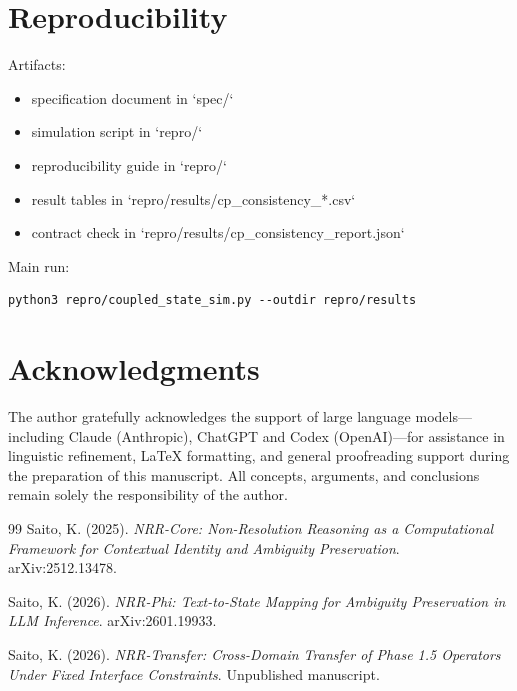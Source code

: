 \documentclass[11pt,a4paper]{article}
\begin{document}
\section{Reproducibility}
\label{sec:reproducibility}
Artifacts:
\begin{itemize}
  \item specification document in `spec/`
  \item simulation script in `repro/`
  \item reproducibility guide in `repro/`
  \item result tables in `repro/results/cp\_consistency\_*.csv`
  \item contract check in `repro/results/cp\_consistency\_report.json`
\end{itemize}

Main run:
\begin{lstlisting}
python3 repro/coupled_state_sim.py --outdir repro/results
\end{lstlisting}

\section*{Acknowledgments}

The author gratefully acknowledges the support of large language
models---including Claude (Anthropic), ChatGPT and Codex (OpenAI)---for assistance in linguistic refinement,
LaTeX formatting, and general proofreading support during the
preparation of this manuscript.
All concepts, arguments, and conclusions remain solely the
responsibility of the author.

\begin{thebibliography}{99}
Saito, K. (2025).
\textit{NRR-Core: Non-Resolution Reasoning as a Computational Framework for Contextual Identity and Ambiguity Preservation}.
arXiv:2512.13478.

Saito, K. (2026).
\textit{NRR-Phi: Text-to-State Mapping for Ambiguity Preservation in LLM Inference}.
arXiv:2601.19933.

Saito, K. (2026).
\textit{NRR-Transfer: Cross-Domain Transfer of Phase 1.5 Operators Under Fixed Interface Constraints}.
Unpublished manuscript.
\end{thebibliography}
\end{document}

